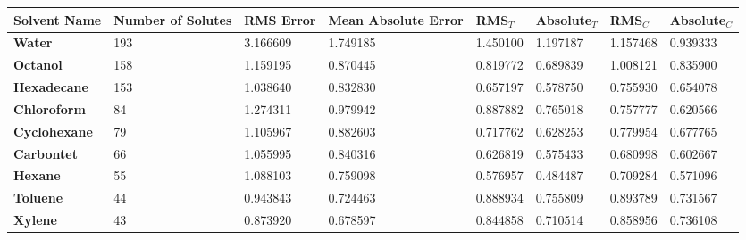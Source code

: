 \documentclass{amsart}
\begin{document}
 
\begin{center}
\begin{tabular}{|l|l|l|l|l|l|l|l|} 
\hline  
\textbf{Solvent Name}&\textbf{Number of Solutes}&\textbf{RMS Error}&\textbf{Mean Absolute Error}&\textbf{RMS$_{T}$}&\textbf{Absolute$_{T}$}&\textbf{RMS$_{C}$}&\textbf{Absolute$_{C}$} \\ \hline
\hline 
\textbf{Water}&193&3.166609&1.749185&1.450100&1.197187&1.157468&0.939333 \\ \hline 
\textbf{Octanol}&158&1.159195&0.870445&0.819772&0.689839&1.008121&0.835900 \\ \hline 
\textbf{Hexadecane}&153&1.038640&0.832830&0.657197&0.578750&0.755930&0.654078 \\ \hline 
\textbf{Chloroform}& 84&1.274311&0.979942&0.887882&0.765018&0.757777&0.620566 \\ \hline 
\textbf{Cyclohexane}& 79&1.105967&0.882603&0.717762&0.628253&0.779954&0.677765 \\ \hline 
\textbf{Carbontet}& 66&1.055995&0.840316&0.626819&0.575433&0.680998&0.602667 \\ \hline 
\textbf{Hexane}& 55&1.088103&0.759098&0.576957&0.484487&0.709284&0.571096 \\ \hline 
\textbf{Toluene}& 44&0.943843&0.724463&0.888934&0.755809&0.893789&0.731567 \\ \hline 
\textbf{Xylene}& 43&0.873920&0.678597&0.844858&0.710514&0.858956&0.736108 \\ \hline 
\end{tabular} 
\end{center} 
\end{document}
